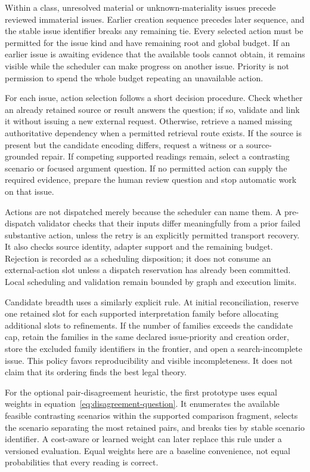\documentclass[12pt,a4paper,oneside,openany]{book}
\begin{document}
Within a class, unresolved material or unknown-materiality issues precede reviewed
immaterial issues. Earlier creation sequence precedes later sequence, and the
stable issue identifier breaks any remaining tie. Every selected action must be
permitted for the issue kind and have remaining root and global budget. If an
earlier issue is awaiting evidence that the available tools cannot obtain, it
remains visible while the scheduler can make progress on another issue. Priority
is not permission to spend the whole budget repeating an unavailable action.

For each issue, action selection follows a short decision procedure. Check whether
an already retained source or result answers the question; if so, validate and
link it without issuing a new external request. Otherwise, retrieve a named
missing authoritative dependency when a permitted retrieval route exists. If the
source is present but the candidate encoding differs, request a witness or a
source-grounded repair. If competing supported readings remain, select a
contrasting scenario or focused argument question. If no permitted action can
supply the required evidence, prepare the human review question and stop automatic
work on that issue.

Actions are not dispatched merely because the scheduler can name them. A
pre-dispatch validator checks that their inputs differ meaningfully from a prior
failed substantive action, unless the retry is an explicitly permitted transport
recovery. It also checks source identity, adapter support and the remaining
budget. Rejection is recorded as a scheduling disposition; it does not consume
an external-action slot unless a dispatch reservation has already been committed.
Local scheduling and validation remain bounded by graph and execution limits.

Candidate breadth uses a similarly explicit rule. At initial reconciliation,
reserve one retained slot for each supported interpretation family before
allocating additional slots to refinements. If the number of families exceeds the
candidate cap, retain the families in the same declared issue-priority and
creation order, store the excluded family identifiers in the frontier, and open
a search-incomplete issue. This policy favors reproducibility and visible
incompleteness. It does not claim that its ordering finds the best legal theory.

For the optional pair-disagreement heuristic, the first prototype uses equal
weights in equation~\eqref{eq:disagreement-question}. It enumerates the available
feasible contrasting scenarios within the supported comparison fragment, selects
the scenario separating the most retained pairs, and breaks ties by stable
scenario identifier. A cost-aware or learned weight can later replace this rule
under a versioned evaluation. Equal weights here are a baseline convenience,
not equal probabilities that every reading is correct.
\end{document}
